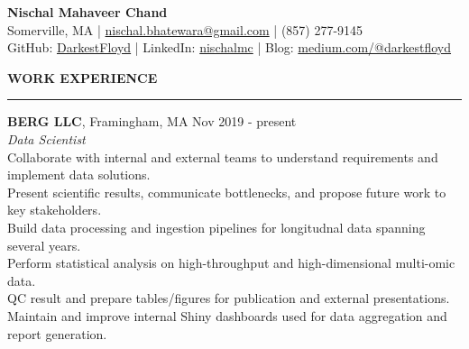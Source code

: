 \documentclass[a4paper]{article}
\newcommand{\myline}{\par
  \kern2pt %
  \hrule height 0.5pt
  \kern2pt %
}
\newcommand{\mybullet}{
	\indent 
  \textbullet \hspace*{2mm}
}
\begin{document}
	\begin{center}
		{\LARGE \textbf{Nischal Mahaveer Chand}} \\
    Somerville, MA | 
    \href{mailto:nischal.bhatewara@gmail.com}{nischal.bhatewara@gmail.com} | 
    (857) 277-9145 \\
                GitHub: \href{https://github.com/darkestfloyd}{DarkestFloyd} | 
                LinkedIn: \href{https://www.linkedin.com/in/nischalmc}{nischalmc} |
		Blog: \href{https://medium.com/@darkestfloyd}{medium.com/@darkestfloyd} \\
	\end{center}
	


	\smallskip
	\smallskip
	\noindent
	{\large \textbf{WORK EXPERIENCE}}
	\myline 
	\smallskip
	
  \noindent
  \textbf{BERG LLC}, Framingham, MA
  \hfill Nov 2019 - present \\
  \textit{Data Scientist} \\
  \mybullet Collaborate with internal and external teams to understand requirements and 
    implement data solutions. \\
  \mybullet Present scientific results, communicate bottlenecks, and propose future work to key stakeholders. \\
  \mybullet Build data processing and ingestion pipelines for longitudnal data spanning several years. \\
  \mybullet Perform statistical analysis on high-throughput and high-dimensional multi-omic data. \\
  \mybullet QC result and prepare tables/figures for publication and external presentations. \\
  \mybullet Maintain and improve internal Shiny dashboards used for data aggregation and report generation. \\
\end{document}
